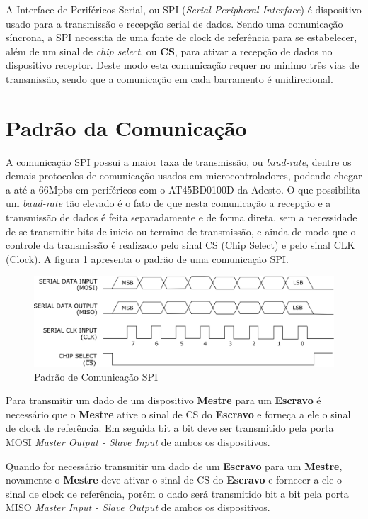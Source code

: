 A Interface de Periféricos Serial, ou SPI (\emph{Serial Peripheral Interface}) é dispositivo usado para a transmissão e recepção serial de dados. Sendo uma comunicação síncrona, a SPI necessita de uma fonte de clock de referência para se estabelecer, além de um sinal de \emph{chip select}, ou \textbf{CS}, para ativar a recepção de dados no dispositivo receptor. Deste modo esta comunicação requer no minimo três vias de transmissão, sendo que a comunicação em cada barramento é unidirecional.

\section{Padrão da Comunicação}

A comunicação SPI possui a maior taxa de transmissão, ou \emph{baud-rate}, dentre os demais protocolos de comunicação usados em microcontroladores, podendo chegar a até a 66Mpbs em periféricos com o AT45BD0100D da Adesto. O que possibilita um  \emph{baud-rate} tão elevado é o fato de que nesta comunicação a recepção e a transmissão de dados é feita separadamente e de forma direta, sem a necessidade de se transmitir bits de inicio ou termino de transmissão, e ainda de modo que o controle da transmissão é realizado pelo sinal CS (Chip Select) e pelo sinal  CLK (Clock).  A figura \ref{fig:SPI} apresenta o padrão de uma comunicação SPI.

\begin{figure}[H]
	\centering
	\includegraphics[width=1\textwidth] {figuras/PadraoSPI.eps}
	\caption{Padrão de Comunicação SPI}
	\label{fig:SPI}
\end{figure}

Para transmitir um dado de um dispositivo \textbf{Mestre} para um \textbf{Escravo} é necessário que o \textbf{Mestre} ative o sinal de CS do \textbf{Escravo} e forneça a ele o sinal de clock de referência. Em seguida bit a bit deve ser transmitido pela porta MOSI \emph{Master Output - Slave Input} de ambos os dispositivos. 

Quando for necessário transmitir um dado de um  \textbf{Escravo} para um \textbf{Mestre}, novamente o \textbf{Mestre} deve ativar o sinal de CS do  \textbf{Escravo} e fornecer a ele o sinal de clock de referência, porém o dado será transmitido bit a bit pela porta MISO \emph{Master Input - Slave Output} de ambos os dispositivos. 

